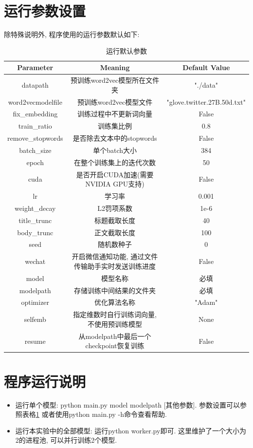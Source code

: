 \documentclass[a4paper]{article}
\begin{document}
	\appendix
	\section{运行参数设置}
	除特殊说明外, 程序使用的运行参数默认如下:
	\begin{table}[H]
		\centering
		\caption{运行默认参数}
		\label{defaultparams}
		\begin{tabular}{@{}ccc@{}}
			\toprule
			\textbf{Parameter}                  & \textbf{Meaning} & \textbf{Default Value}  \\ \midrule
			datapath & 预训练word2vec模型所在文件夹 & "./data"          \\
			word2vecmodelfile & 预训练word2vec模型文件 & "glove.twitter.27B.50d.txt"          \\
			fix\_embedding & 训练过程中不更新词向量 & False          \\
			train\_ratio & 训练集比例 & 0.8          \\
			remove\_stopwords & 是否除去文本中的stopwords & False         \\
			batch\_size & 单个batch大小 & 384          \\
			epoch & 在整个训练集上的迭代次数 & 50 \\ 
			cuda & 是否开启CUDA加速(需要NVIDIA GPU支持) & False\\
			lr & 学习率 & 0.001\\
			weight\_decay & L2罚项系数 & 1e-6\\
			title\_trunc & 标题截取长度 & 40\\
			body\_trunc & 正文截取长度 & 100\\
			seed & 随机数种子 & 0\\
			wechat & 开启微信通知功能, 通过文件传输助手实时发送训练进度 & False\\
			model & 模型名称 & 必填\\
			modelpath & 存储训练中间结果的文件夹 & 必填\\
			optimizer & 优化算法名称 & "Adam"\\
			selfemb & 指定维数时自行训练词向量, 不使用预训练模型 & None\\
			resume & 从modelpath中最后一个checkpoint恢复训练 & False\\
			\bottomrule
		\end{tabular}
	\end{table}
	\section{程序运行说明}
	\begin{itemize}
		\item 运行单个模型: python main.py model modelpath [其他参数]. 参数设置可以参照表格\ref{defaultparams} 或者使用python main.py -h命令查看帮助.
		\item 运行本实验中的全部模型: 运行python worker.py即可. 这里维护了一个大小为2的进程池, 可以并行训练2个模型.
	\end{itemize}
	
\end{document}
